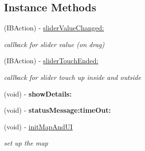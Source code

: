 \subsection*{Instance Methods}
\begin{DoxyCompactItemize}
\item 
\hypertarget{category_cerca_pix_map_view_controller_07_08_a529990369fdd2d1c2116ba18252b36af}{(I\-B\-Action) -\/ \hyperlink{category_cerca_pix_map_view_controller_07_08_a529990369fdd2d1c2116ba18252b36af}{slider\-Value\-Changed\-:}}\label{category_cerca_pix_map_view_controller_07_08_a529990369fdd2d1c2116ba18252b36af}

\begin{DoxyCompactList}\small\item\em callback for slider value (on drag) \end{DoxyCompactList}\item 
\hypertarget{category_cerca_pix_map_view_controller_07_08_aa5e5358faf9991f73188b80ec1d58abc}{(I\-B\-Action) -\/ \hyperlink{category_cerca_pix_map_view_controller_07_08_aa5e5358faf9991f73188b80ec1d58abc}{slider\-Touch\-Ended\-:}}\label{category_cerca_pix_map_view_controller_07_08_aa5e5358faf9991f73188b80ec1d58abc}

\begin{DoxyCompactList}\small\item\em callback for slider touch up inside and outside \end{DoxyCompactList}\item 
\hypertarget{category_cerca_pix_map_view_controller_07_08_aae475d77449bb3990a4a1db92c011e3b}{(void) -\/ {\bfseries show\-Details\-:}}\label{category_cerca_pix_map_view_controller_07_08_aae475d77449bb3990a4a1db92c011e3b}

\item 
\hypertarget{category_cerca_pix_map_view_controller_07_08_ab644ff1007116ee23dfc9a331fa49e66}{(void) -\/ {\bfseries status\-Message\-:time\-Out\-:}}\label{category_cerca_pix_map_view_controller_07_08_ab644ff1007116ee23dfc9a331fa49e66}

\item 
\hypertarget{category_cerca_pix_map_view_controller_07_08_af27b3e6887a3ebce887355a4ed607b5e}{(void) -\/ \hyperlink{category_cerca_pix_map_view_controller_07_08_af27b3e6887a3ebce887355a4ed607b5e}{init\-Map\-And\-U\-I}}\label{category_cerca_pix_map_view_controller_07_08_af27b3e6887a3ebce887355a4ed607b5e}

\begin{DoxyCompactList}\small\item\em set up the map \end{DoxyCompactList}\end{DoxyCompactItemize}
